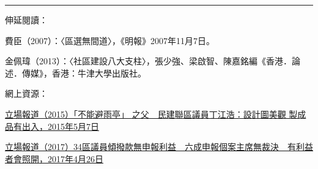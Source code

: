 \rule[-10pt]{15cm}{0.05em}

伸延閱讀：

費臣（2007）：〈區選無間道〉，《明報》2007年11月7日。

金佩瑋（2013）：〈社區建設八大支柱〉，張少強、梁啟智、陳嘉銘編《香港．論述．傳媒》，香港：牛津大學出版社。

網上資源：

\href{https://thestandnews.com/society/不能避雨亭-之父-民建聯區議員丁江浩-設計圖美觀-製成品有出入/ }{立場報道（2015）「不能避雨亭」 之父　民建聯區議員丁江浩：設計圖美觀 製成品有出入，2015年5月7日}

\href{https://www.thestandnews.com/politics/審計報告-34區議員討論撥款時-無申報利益/}{立場報道（2017）34區議員傾撥款無申報利益　六成申報個案主席無裁決　有利益者會照開，2017年4月26日}